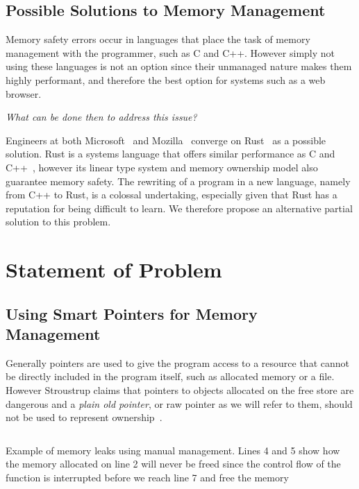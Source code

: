 \documentclass{proposal}
\begin{document}
    \subsection{Possible Solutions to Memory Management}\label{subsec:possible-solutions-to-memory-management}

    Memory safety errors occur in languages that place the task of memory management with the programmer, such as C and C++.
    However simply not using these languages is not an option since their unmanaged nature makes them highly performant, and therefore the best option for systems such as a web browser.

    \emph{What can be done then to address this issue?}

    Engineers at both Microsoft~\cite{Thomas2019} and Mozilla~\cite{Hostfelt2019} converge on Rust~\cite{Balasubramanian2017} as a possible solution.
    Rust is a systems language that offers similar performance as C and C++~\cite{Lin2016}, however its linear type system and memory ownership model also guarantee memory safety.
    The rewriting of a program in a new language, namely from C++ to Rust, is a colossal undertaking, especially given that Rust has a reputation for being difficult to learn.
    We therefore propose an alternative partial solution to this problem.




    \section{Statement of Problem}\label{sec:statement-of-problem}

    \subsection{Using Smart Pointers for Memory Management}\label{subsec:using-smart-pointers-for-memory-management}

    Generally pointers are used to give the program access to a resource that cannot be directly included in the program itself, such as allocated memory or a file.
    However Stroustrup claims that pointers to objects allocated on the free store are dangerous and a \emph{plain old pointer}, or raw pointer as we will refer to them, should not be used to represent ownership~\cite{Stroustrup2018}.

    \begin{listing}
        \inputminted{c++}{code/manual-leak.cpp}
        \caption{Example of memory leaks using manual management. Lines 4 and 5 show how the memory allocated on line 2 will never be freed since the control flow of the function is interrupted before we reach line 7 and free the memory}
        \label{lst:manual-leak}
    \end{listing}
\end{document}
